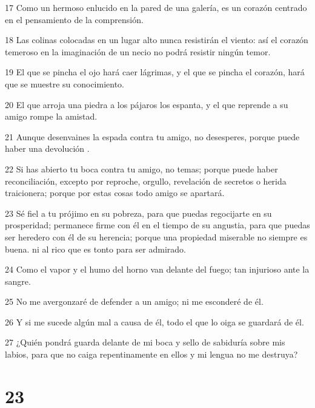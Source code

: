 \par 17 Como un hermoso enlucido en la pared de una galería, es un corazón centrado en el pensamiento de la comprensión.
\par 18 Las colinas colocadas en un lugar alto nunca resistirán el viento: así el corazón temeroso en la imaginación de un necio no podrá resistir ningún temor.
\par 19 El que se pincha el ojo hará caer lágrimas, y el que se pincha el corazón, hará que se muestre su conocimiento.
\par 20 El que arroja una piedra a los pájaros los espanta, y el que reprende a su amigo rompe la amistad.
\par 21 Aunque desenvaines la espada contra tu amigo, no desesperes, porque puede haber una devolución .
\par 22 Si has abierto tu boca contra tu amigo, no temas; porque puede haber reconciliación, excepto por reproche, orgullo, revelación de secretos o herida traicionera; porque por estas cosas todo amigo se apartará.
\par 23 Sé fiel a tu prójimo en su pobreza, para que puedas regocijarte en su prosperidad; permanece firme con él en el tiempo de su angustia, para que puedas ser heredero con él de su herencia; porque una propiedad miserable no siempre es buena. ni al rico que es tonto para ser admirado.
\par 24 Como el vapor y el humo del horno van delante del fuego; tan injurioso ante la sangre.
\par 25 No me avergonzaré de defender a un amigo; ni me esconderé de él.
\par 26 Y si me sucede algún mal a causa de él, todo el que lo oiga se guardará de él.
\par 27 ¿Quién pondrá guarda delante de mi boca y sello de sabiduría sobre mis labios, para que no caiga repentinamente en ellos y mi lengua no me destruya?

\chapter{23}

